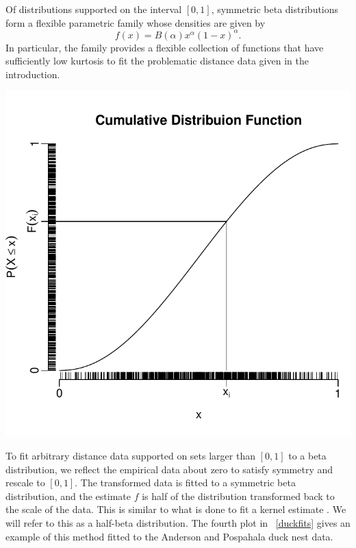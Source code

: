 \documentclass[12pt]{amsart}
\newcommand{\figref}[1]{\figurename~\ref{#1}}
\newenvironment{Figure}{\par\medskip\noindent\minipage{\linewidth}}{\endminipage\par\medskip}
\begin{document}
\begin{multicols}{2}
Of distributions supported on the interval $[0,1]$, symmetric beta distributions form a flexible parametric family whose densities are given by
\begin{equation}
  f(x) = B(\alpha) x^\alpha (1-x)^\alpha.
\end{equation}
In particular, the family provides a flexible collection of functions that have sufficiently low kurtosis to fit the problematic distance data given in the introduction. 
\begin{Figure}
\includegraphics[width=\linewidth]{../cdf_example.pdf}
\end{Figure}
To fit arbitrary distance data supported on sets larger than $[0,1]$ to a beta distribution, we reflect the empirical data about zero to satisfy symmetry and rescale to $[0,1]$. 
The transformed data is fitted to a symmetric beta distribution, and the estimate $f$ is half of the distribution transformed back to the scale of the data.
This is similar to what is done to fit a kernel estimate \cite{thompson2012sampling}.
We will refer to this as a half-beta distribution.  
The fourth plot in \figref{duckfits} gives an example of this method fitted to the Anderson and Pospahala duck nest data.


\end{multicols}
\end{document}
